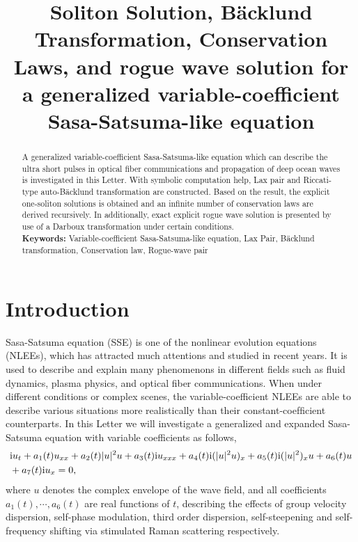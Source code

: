 \documentclass[12pt]{article}
\title{\large\bfseries Soliton Solution, B\"acklund Transformation, Conservation Laws, and rogue wave solution for a generalized variable-coefficient Sasa-Satsuma-like equation}
\author{}
\begin{document}
\maketitle

\begin{abstract}
A generalized variable-coefficient Sasa-Satsuma-like equation which can describe the ultra short pulses in optical fiber communications and propagation of deep ocean waves is investigated in this Letter. With symbolic computation help, Lax pair and Riccati-type auto-B\"acklund transformation are constructed. Based on the result, the explicit one-soliton solutions is obtained and an infinite number of conservation laws are derived recursively. In additionally, exact explicit rogue wave solution is presented by use of a Darboux transformation under certain conditions. \\
\indent\textbf{Keywords:} Variable-coefficient Sasa-Satsuma-like equation, Lax Pair, B\"acklund transformation, Conservation law, Rogue-wave pair
\end{abstract}

\section{Introduction}
Sasa-Satsuma equation (SSE) is one of the nonlinear evolution equations (NLEEs), which has attracted much attentions and studied in recent years. It is used to describe and explain many phenomenons in different fields such as fluid dynamics, plasma physics, and optical fiber communications. When under different conditions or complex scenes, the variable-coefficient NLEEs are able to describe various situations more realistically than their constant-coefﬁcient counterparts. In this Letter we will investigate a generalized and expanded Sasa-Satsuma equation with variable coefficients as follows,
\begin{align}
  & \mathrm{i}u_{t} + a_{1}(t)u_{xx} + a_2(t)|u|^{2}u + a_3(t)\mathrm{i}u_{xxx} + a_{4}(t)\mathrm{i}(|u|^{2}u)_{x} + a_{5}(t)\mathrm{i}(|u|^{2})_{x}u + a_{6}(t)u \notag\\
  & + a_{7}(t)\mathrm{i}u_{x}=0,   \label{1}
\end{align}
where $u$ denotes the complex envelope of the wave field, and all coefficients $a_{1}(t), \cdots, a_{6}(t)$ are real functions of $t$, describing the effects of group velocity dispersion, self-phase modulation, third order dispersion, self-steepening and self-frequency shifting via stimulated Raman scattering respectively.
\end{document}
